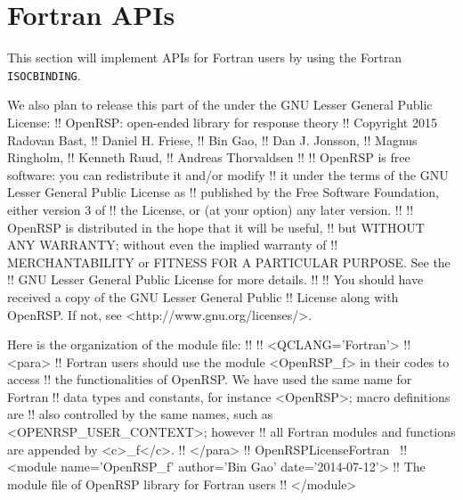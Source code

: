 \nwendcode{}\section{Fortran APIs}
\label{section-OpenRSP-Fortran}

This section will implement APIs for Fortran users by using the Fortran
{\tt{}ISO{}C{}BINDING}.

We also plan to release this part of the \LibName under the GNU Lesser General
Public License:
\nwenddocs{}\endmoddef
!! OpenRSP: open-ended library for response theory
!! Copyright 2015 Radovan Bast,
!!                Daniel H. Friese,
!!                Bin Gao,
!!                Dan J. Jonsson,
!!                Magnus Ringholm,
!!                Kenneth Ruud,
!!                Andreas Thorvaldsen
!!
!! OpenRSP is free software: you can redistribute it and/or modify
!! it under the terms of the GNU Lesser General Public License as
!! published by the Free Software Foundation, either version 3 of
!! the License, or (at your option) any later version.
!!
!! OpenRSP is distributed in the hope that it will be useful,
!! but WITHOUT ANY WARRANTY; without even the implied warranty of
!! MERCHANTABILITY or FITNESS FOR A PARTICULAR PURPOSE. See the
!! GNU Lesser General Public License for more details.
!!
!! You should have received a copy of the GNU Lesser General Public
!! License along with OpenRSP. If not, see <http://www.gnu.org/licenses/>.

\nwendcode{}Here is the organization of the module file:
\nwenddocs{}\endmoddef
!!
!! <QCLANG='Fortran'>
!! <para>
!!   Fortran users should use the module <OpenRSP_f> in their codes to access
!!   the functionalities of OpenRSP. We have used the same name for Fortran
!!   data types and constants, for instance <OpenRSP>; macro definitions are
!!   also controlled by the same names, such as <OPENRSP_USER_CONTEXT>; however
!!   all Fortran modules and functions are appended by <c>_f</c>.
!! </para>
!!
\LA{}OpenRSPLicenseFortran~{\nwtagstyle{}}\RA{}
!! <module name='OpenRSP_f' author='Bin Gao' date='2014-07-12'>
!!   The module file of OpenRSP library for Fortran users
!! </module>

